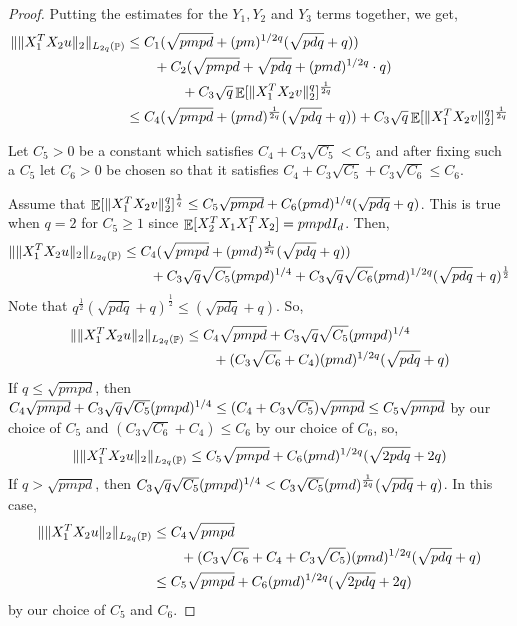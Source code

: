 \documentclass[11pt]{amsart}
\numberwithin{equation}{section}
\numberwithin{equation}{section}
\DeclareMathOperator{\E}{\mathbb{E}}
\DeclareMathOperator{\Pb}{\mathbb{P}}
\DeclarePairedDelimiter{\norm}{\lVert}{\rVert}
\DeclarePairedDelimiter{\paren}{(}{)}
\DeclarePairedDelimiter{\sqbr}{[}{]}
\begin{document}
\begin{proof}
Putting the estimates for the $Y_1, Y_2$ and $Y_3$ terms together, we get,
\begin{align*}
    \norm{\norm{X_1^TX_2u}_2}_{L_{2q}(\Pb)} &\le C_1(\sqrt{pmpd} + (pm)^{1/2q} (\sqrt{pdq} + q) ) \\
    &\qquad +  C_2(\sqrt{pmpd} + \sqrt{pdq} + (pmd)^{1/2q} \cdot q ) \\
    &\qquad \qquad + C_3 \sqrt{q} \E \sqbr{ \norm{X_1^TX_2v}_2^q}^\frac{1}{2q} \\
    &\le C_4(\sqrt{pmpd} + (pmd)^\frac{1}{2q} (\sqrt{pdq} + q) ) + C_3 \sqrt{q} \E \sqbr{ \norm{X_1^TX_2v}_2^q}^\frac{1}{2q}
\end{align*}

Let $C_5>0$ be a constant which satisfies $C_4 + C_3\sqrt{C_5} < C_5$ and after fixing such a $C_5$ let $C_6>0$ be chosen so that it satisfies $C_4 + C_3\sqrt{C_5} + C_3\sqrt{C_6} \le C_6$. 

Assume that $\E \sqbr{ \norm{X_1^TX_2v}_2^q}^\frac{1}{q} \le C_5 \sqrt{pmpd} + C_6(pmd)^{1/q}(\sqrt{pdq} + q)$. This is true when $q=2$ for $C_5 \ge 1$ since $\E \sqbr{X_2^T X_1 X_1^T X_2} = pmpd I_d$. Then,
\begin{align*}
    \norm{\norm{X_1^TX_2u}_2}_{L_{2q}(\Pb)} &\le C_4(\sqrt{pmpd} + (pmd)^\frac{1}{2q} (\sqrt{pdq} + q) ) \\
    & \qquad +  C_3 \sqrt{q}\sqrt{C_5} \paren{pmpd}^{1/4} + C_3 \sqrt{q} \sqrt{C_6}(pmd)^{1/2q}(\sqrt{pdq} + q)^\frac{1}{2} \\
\end{align*}
Note that $q^\frac{1}{2}(\sqrt{pdq} + q)^\frac{1}{2} \le (\sqrt{pdq} + q)$. So, 
\begin{align*}
    \norm{\norm{X_1^TX_2u}_2}_{L_{2q}(\Pb)} &\le C_4\sqrt{pmpd} +  C_3 \sqrt{q}\sqrt{C_5} \paren{pmpd}^{1/4}  \\
    & \qquad  + (C_3 \sqrt{C_6} + C_4)(pmd)^{1/2q}(\sqrt{pdq} + q) \\
\end{align*}
If $q\le \sqrt{pmpd} $, then $ C_4\sqrt{pmpd} +  C_3 \sqrt{q}\sqrt{C_5} \paren{pmpd}^{1/4} \le (C_4 + C_3\sqrt{C_5})\sqrt{pmpd} \le C_5\sqrt{pmpd}$ by our choice of $C_5$ and $(C_3 \sqrt{C_6} + C_4) \le C_6$ by our choice of $C_6$, so,
\begin{align*}
    \norm{\norm{X_1^TX_2u}_2}_{L_{2q}(\Pb)} &\le C_5\sqrt{pmpd}  + C_6 (pmd)^{1/2q}(\sqrt{2pdq} + 2q) \\
\end{align*}
If $q>\sqrt{pmpd}$, then $C_3 \sqrt{q}\sqrt{C_5} \paren{pmpd}^{1/4} < C_3\sqrt{C_5}(pmd)^\frac{1}{2q}(\sqrt{pdq} + q)$. In this case, 
\begin{align*}
    \norm{\norm{X_1^TX_2u}_2}_{L_{2q}(\Pb)} &\le C_4\sqrt{pmpd} \\ 
    & \qquad + (C_3 \sqrt{C_6} + C_4 + C_3\sqrt{C_5})(pmd)^{1/2q}(\sqrt{pdq} + q) \\
    &\le C_5\sqrt{pmpd}  + C_6 (pmd)^{1/2q}(\sqrt{2pdq} + 2q) \\
\end{align*}
by our choice of $C_5$ and $C_6$. 

\end{proof}
\end{document}
